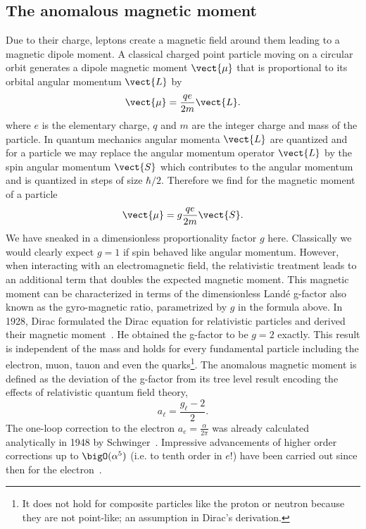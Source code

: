 \subsection{The anomalous magnetic moment}

Due to their charge, leptons create a magnetic field around them leading to a magnetic dipole moment.
A classical charged point particle moving on a circular orbit generates a dipole magnetic moment $\vect{\mu}$ that is proportional to its orbital angular momentum $\vect{L}$ by
\begin{equation}
\vect{\mu} = \frac{q e}{2 m} \vect{L}.
\end{equation}
where $e$ is the elementary charge, $q$ and $m$ are the integer charge and mass of the particle.
In quantum mechanics angular momenta $\vect{L}$ are quantized and for a \spinhalf particle we may replace the angular momentum operator $\vect{L}$ by the spin angular momentum $\vect{S}$ which contributes to the angular momentum and is quantized in steps of size $\hbar/2$.
Therefore we find for the magnetic moment of a \spinhalf particle
\begin{equation}
\vect{\mu} = g \frac{q e}{2 m} \vect{S}.
\end{equation}
We have sneaked in a dimensionless proportionality factor $g$ here.
Classically we would clearly expect $g=1$ if spin behaved like angular momentum.
However, when interacting with an electromagnetic field, the relativistic treatment leads to an additional term that doubles the expected magnetic moment.
This magnetic moment can be characterized in terms of the dimensionless Landé g-factor also known as the gyro-magnetic ratio, parametrized by $g$ in the formula above.
In 1928, Dirac formulated the Dirac equation for relativistic \spinhalf particles and derived their magnetic moment~\cite{dirac1928quantum}.
He obtained the g-factor to be $g=2$ exactly.
This result is independent of the mass and holds for every fundamental \spinhalf particle including the electron, muon, tauon and even the quarks\footnote{It does not hold for composite \spinhalf particles like the proton or neutron because they are not point-like; an assumption in Dirac's derivation.}.
The anomalous magnetic moment is defined as the deviation of the g-factor from its tree level result encoding the effects of relativistic quantum field theory,
\begin{equation}
a_{\ell} = \frac{g_{\ell}-2}{2}.
\end{equation}
The one-loop correction to the electron $a_{e} = \frac{\alpha}{2 \pi}$ was already calculated analytically in 1948 by Schwinger~\cite{Schwinger:1948}.
Impressive advancements of higher order corrections up to $\bigO(\alpha^{5})$ (i.e. to tenth order in $e$!) have been carried out since then for the electron~\cite{laporta1996analytical,PhysRevLett.109.111807,PhysRevD.91.033006,nio2015qed}.


